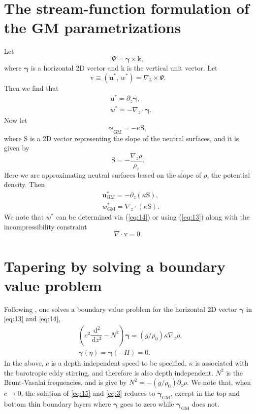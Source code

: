 \documentclass[12pt]{report}
\def\p{\partial}
\def\bs{\boldsymbol}
\def\ud{\,\mathrm{d}}
\def\ub{\mathbf{u}}
\def\vb{\bs{\mathrm{v}}}
\def\kb{\bs{\mathrm{k}}}
\def\Sb{\bs{\mathrm{S}}}
\begin{document}
\section{The stream-function formulation of the GM
  parametrizations}\label{sec:stre-funct-form} 
Let 
\begin{equation}
  \label{eq:10}
  \Psi = \bs{\gamma}\times\kb,
\end{equation}
where $\bs{\gamma}$ is a horizontal 2D vector and $\kb$ is the
vertical unit vector. Let 
\begin{equation}
  \label{eq:2}
  \vb \equiv (\ub^\ast,\,w^\ast) = \nabla_3 \times\Psi.
\end{equation}
Then we find that 
\begin{align}
  &\ub^\ast = \p_z\bs{\gamma},\label{eq:13}\\
 &w^\ast = -\nabla_z\cdot\bs{\gamma}.\label{eq:14}
\end{align}
Now let 
\begin{equation}
  \label{eq:11}
  \bs{\gamma}_\textrm{GM} = -\kappa\Sb,
\end{equation}
where $\Sb$ is a 2D vector representing the slope of the neutral
surfaces, and it is given by 
\begin{equation}
  \label{eq:9}
  \Sb = -\dfrac{\nabla_z \rho}{\rho_z}.
\end{equation}
Here we are approximating neutral surfaces based on the slope 
of $\rho$, the potential density. 
Then
\begin{align}
  &\ub^\ast_\textrm{GM} = -\p_z(\kappa\Sb),  \label{eq:12}\\
  &w^\ast_\textrm{GM} = \nabla_z\cdot(\kappa \Sb).
\end{align}
We note that $w^\ast$ can be determined via (\ref{eq:14}) or using
(\ref{eq:13}) along with the incompressibility constraint
\begin{equation}
  \label{eq:2}
  \nabla \cdot \vb = 0. 
\end{equation}


\section{Tapering by solving a boundary value
  problem}\label{sec:taper-solv-bound}  
Following \cite{Ferrari10}, one solves a boundary value
problem for the horizontal 2D vector
$\bs{\gamma}$ in \eqref{eq:13} and \eqref{eq:14},
\begin{align}
  &\left( c^2\dfrac{\ud^2}{\ud z^2} - N^2\right)\bs{\gamma} =
  (g/\rho_0)\kappa \nabla_z\rho,\label{eq:15}\\
  &\bs{\gamma}(\eta) = \bs{\gamma}(-H) = 0.\label{eq:3}
\end{align}
In the above, $c$ is a depth independent speed to be specified,
$\kappa$ is associated with the barotropic eddy stirring, and
therefore is also depth independent. $N^2$ is the Brunt-Vasalai
frequencies, and is give by $N^2 = -(g/\rho_0)\p_z\rho$. We note that,
when $c\longrightarrow 0$, the solution of \eqref{eq:15} and
\eqref{eq:3} reduces to $\bs{\gamma}_\textrm{GM}$, except in the top
and bottom thin boundary layers where $\bs{\gamma}$ goes to zero
while $\bs{\gamma}_\textrm{GM}$ does not.
\end{document}

